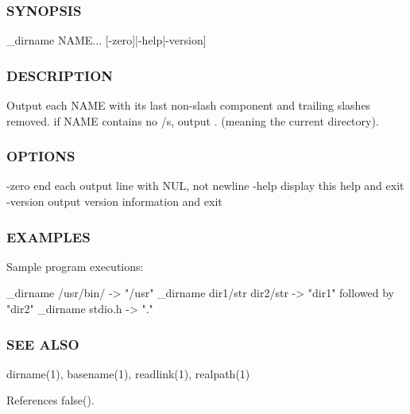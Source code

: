 \subsubsection*{S\+Y\+N\+O\+P\+S\+IS}

\begin{DoxyVerb}_dirname NAME... [-zero]|-help|-version]
\end{DoxyVerb}


\subsubsection*{D\+E\+S\+C\+R\+I\+P\+T\+I\+ON}

Output each N\+A\+ME with its last non-\/slash component and trailing slashes removed. if N\+A\+ME contains no /\textquotesingle{}s, output \textquotesingle{}.\textquotesingle{} (meaning the current directory).

\subsubsection*{O\+P\+T\+I\+O\+NS}

-\/zero end each output line with N\+UL, not newline -\/help display this help and exit -\/version output version information and exit

\subsubsection*{E\+X\+A\+M\+P\+L\+ES}

\begin{DoxyVerb}Sample program executions:

  _dirname /usr/bin/          -> "/usr"
  _dirname dir1/str dir2/str  -> "dir1" followed by "dir2"
  _dirname stdio.h            -> "."
\end{DoxyVerb}


\subsubsection*{S\+EE A\+L\+SO}

dirname(1), basename(1), readlink(1), realpath(1) 

References false().

